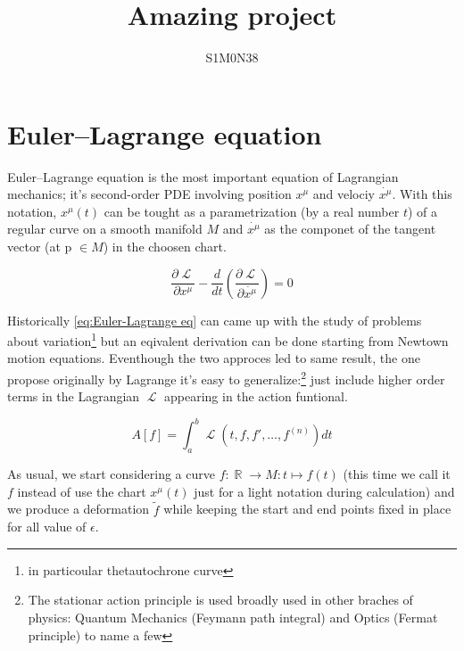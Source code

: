 \documentclass[a4paper]{article}
\title{Amazing project}
\author{S1M0N38}
\DeclareMathOperator{\Lagr}{\mathcal{L}} %
\DeclareMathOperator{\R}{\mathbb{R}} %
\begin{document}
  \maketitle
  \newpage

  \begin{abstract}
    \lipsum[1]
  \end{abstract}
  \newpage


  \section{Euler–Lagrange equation}

  Euler–Lagrange equation is the most important equation of Lagrangian
  mechanics; it's second-order PDE involving position $x^{\mu}$ and velociy
  $\dot{x^{\mu}}$. With this notation, $x^{\mu}(t)$ can be tought as a
  parametrization (by a real number $t$) of a regular curve on a smooth
  manifold $M$ and $\dot{x^{\mu}}$ as the componet of the tangent vector (at
  p $\in M$) in the choosen chart.

  \begin{equation} \label{eq:Euler-Lagrange eq}
    \frac{\partial\Lagr}{\partial x^{\mu}} -
    \frac{d}{dt}\left(\frac{\partial\Lagr}{\partial \dot{x^{\mu}}}\right) = 0
  \end{equation}

  Historically \eqref{eq:Euler-Lagrange eq} can came up with the study of
  problems about variation\footnote{in particoular thetautochrone curve} but
  an eqivalent derivation can be done starting from Newtown motion equations.
  Eventhough the two approces led to same result, the one
  propose originally by Lagrange it's easy to generalize:\footnote{The
  stationar action principle is used broadly used in other braches of physics:
  Quantum Mechanics (Feymann path integral) and Optics (Fermat principle) to
  name a few} just include higher order terms in the Lagrangian $\Lagr$
  appearing in the action funtional.

  \begin{equation*}
    A[f] = \int_{a}^{b} \Lagr(t, f, f', \ldots, f^{(n)}) dt
  \end{equation*}

  As usual, we start considering a curve $f: \R \rightarrow M: t \mapsto f(t)$
  (this time we call it $f$ instead of use the chart $x^{\mu}(t)$ just for
  a light notation during calculation) and we produce a deformation $\tilde{f}$
  while keeping the start and end points fixed in place for all value of
  $\epsilon$.
\end{document}
